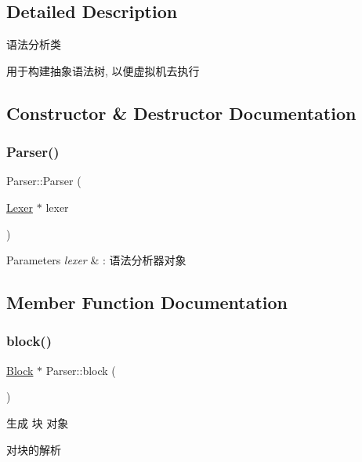 \subsection{Detailed Description}
语法分析类 

用于构建抽象语法树, 以便虚拟机去执行 

\subsection{Constructor \& Destructor Documentation}
\mbox{\label{class_parser_a25929f4bcec5c5ff010218f001203b73}} 
\subsubsection{\texorpdfstring{Parser()}{Parser()}}
{\footnotesize\ttfamily Parser\+::\+Parser (\begin{DoxyParamCaption}\item[{\hyperlink{class_lexer}{Lexer} $\ast$}]{lexer }\end{DoxyParamCaption})}


\begin{DoxyParams}{Parameters}
{\em lexer} & \+: 语法分析器对象 \\
\hline
\end{DoxyParams}


\subsection{Member Function Documentation}
\mbox{\label{class_parser_a2e96322fd6d40261ab256a726634c1b3}} 
\subsubsection{\texorpdfstring{block()}{block()}}
{\footnotesize\ttfamily \hyperlink{class_block}{Block} $\ast$ Parser\+::block (\begin{DoxyParamCaption}{ }\end{DoxyParamCaption})\hspace{0.3cm}{\ttfamily [protected]}}



生成 块 对象 

对块的解析 \mbox{\label{class_parser_a44a52c6402e86b0a200e02b516f8e9fe}} 
